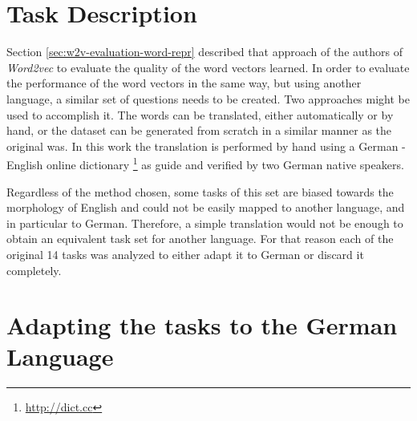 \section{Task Description}
\label{sec:task_description} 


Section \ref{sec:w2v-evaluation-word-repr} described that approach of the
authors of \textit{Word2vec} to evaluate the quality of the word vectors
learned. In order to evaluate the performance of the word vectors in the same
way, but using another language,  a
similar set of questions  needs to be created. Two approaches might be used
to accomplish it. The words can be translated, either automatically or by hand, or the dataset can be
generated from scratch in a similar manner as the original was.  In this work
the translation is performed by hand using a German - English online
dictionary \footnote{\url{http://dict.cc}} as guide and verified by two German native speakers.

Regardless of the method chosen, some tasks of this set are biased towards
the morphology of English and could not be easily mapped to another language,
and in particular to German. Therefore, a simple translation would not be
enough to obtain an equivalent task set for another language. For that reason
each of the original 14 tasks was analyzed to either adapt it to German or
discard it completely.  


\section{Adapting the tasks to the German Language}
\label{sec:adapt_task_german_lang}

